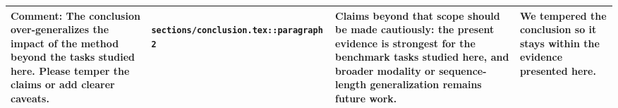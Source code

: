 \documentclass[11pt]{article}
\begin{document}
\begin{longtable}{|p{}|p{}|p{}|p{}|}
\hline
\textbf{Comment:} The conclusion over-generalizes the impact of the method beyond the tasks studied here. Please temper the claims or add clearer caveats. & \texttt{ sections/conclusion.tex::paragraph 2 } & {\color{blue}\ttfamily Claims beyond that scope should be made cautiously: the present evidence is strongest for the benchmark tasks studied here, and broader modality or sequence-length generalization remains future work.} & We tempered the conclusion so it stays within the evidence presented here. \\
\hline
\end{longtable}
\end{document}
